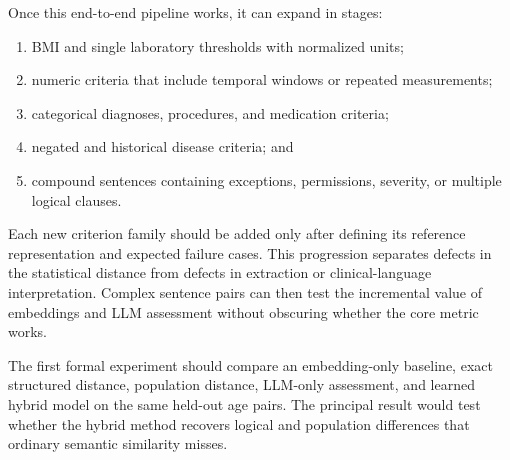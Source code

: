 \documentclass[11pt]{article}
\begin{document}
Once this end-to-end pipeline works, it can expand in stages:

\begin{enumerate}
    \item BMI and single laboratory thresholds with normalized units;
    \item numeric criteria that include temporal windows or repeated measurements;
    \item categorical diagnoses, procedures, and medication criteria;
    \item negated and historical disease criteria; and
    \item compound sentences containing exceptions, permissions, severity, or multiple logical clauses.
\end{enumerate}

Each new criterion family should be added only after defining its reference representation and expected failure cases. This progression separates defects in the statistical distance from defects in extraction or clinical-language interpretation. Complex sentence pairs can then test the incremental value of embeddings and LLM assessment without obscuring whether the core metric works.

The first formal experiment should compare an embedding-only baseline, exact structured distance, population distance, LLM-only assessment, and learned hybrid model on the same held-out age pairs. The principal result would test whether the hybrid method recovers logical and population differences that ordinary semantic similarity misses.
\end{document}
